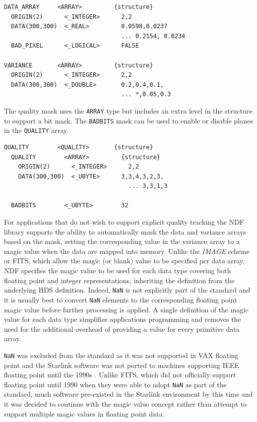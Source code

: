 \documentclass[final,authoryear,5p,times,twocolumn]{elsarticle}
\begin{document}
{\small
\begin{verbatim}
DATA_ARRAY     <ARRAY>         {structure}
  ORIGIN(2)      <_INTEGER>      2,2
  DATA(300,300)  <_REAL>         0.0598,0.0237
                                 ... 0.2154, 0.0234
  BAD_PIXEL      <_LOGICAL>      FALSE

VARIANCE       <ARRAY>         {structure}
  ORIGIN(2)      <_INTEGER>      2,2
  DATA(300,300)  <_DOUBLE>       0.2,0.4,0.1,
                                 ... *,0.05,0.3
\end{verbatim}
}

The quality mask uses the \texttt{ARRAY} type but includes an extra
level in the structure to support a bit mask. The \texttt{BADBITS}
mask can be used to enable or disable planes in the \texttt{QUALITY} array.

{\small
\begin{verbatim}
QUALITY        <QUALITY>       {structure}
  QUALITY        <ARRAY>         {structure}
    ORIGIN(2)      <_INTEGER>      2,2
    DATA(300,300)  <_UBYTE>      3,3,4,3,2,3,
                                   ... 3,3,1,3

  BADBITS        <_UBYTE>        32
\end{verbatim}
}

For applications that do not wish to support explicit quality tracking
the NDF library supports the ability to automatically mask the data
and variance arrays based on the mask, setting the corresponding value
in the variance array to a magic value when the data are mapped into
memory. Unlike the \emph{IMAGE} scheme
or FITS, which allow the magic (or blank) value to be specified per
data array, NDF specifies the magic value to be used for each data type
covering both floating point and integer representations, inheriting
the definition from the underlying HDS definition. Indeed,
\texttt{NaN} is not explicitly part of the standard and it is usually
best to convert \texttt{NaN} elements to the corresponding floating point magic
value before further processing is applied. A single definition of the
magic value for each data type simplifies applications programming and
removes the need for the additional overhead of providing a value for
every primitive data array.

\texttt{NaN} was excluded from the standard as it was not
supported in VAX floating point \citep[see e.g.][]{660194} and the Starlink
software was not ported to machines supporting IEEE floating point
until the 1990s \citep[e.g.,][]{1991STARB...8...11C}. Unlike FITS, which
did not officially support floating point until 1990
\citep{1989FPFITS,1991BAAS...23..993S} when they were able to adopt
\texttt{NaN} as part of the standard, much software pre-existed in the
Starlink environment by this time and it was decided to continue with
the magic value concept rather than attempt to support multiple magic
values in floating point data.
\end{document}
